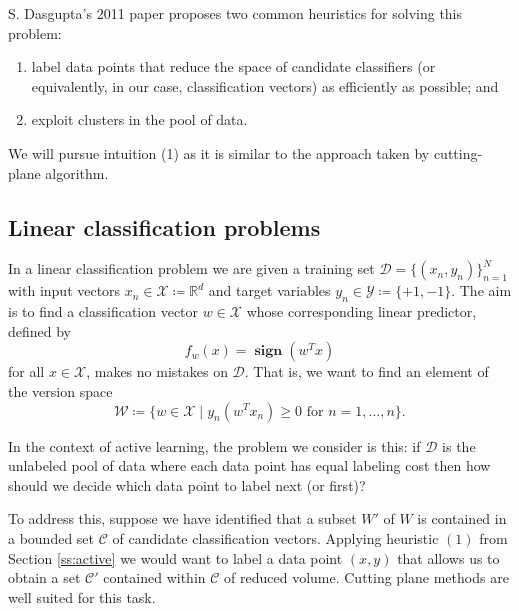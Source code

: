 \documentclass[11pt]{amsart}
\theoremstyle{definition}
\theoremstyle{remark}
\newcommand{\transpose}{T}
\DeclareMathOperator{\sign}{\textbf{sign}}
\begin{document}
        S. Dasgupta's 2011 paper \cite{Das11} proposes two common heuristics for solving this problem:
        \begin{enumerate}
            \item label data points that reduce the space of candidate classifiers (or equivalently, in our case, classification vectors) as efficiently as possible; and
            \item exploit clusters in the pool of data.
        \end{enumerate}   
        We will pursue intuition (1) as it is similar to the approach taken by cutting-plane algorithm. 

    \subsection{Linear classification problems}\label{ss:classification}
        In a linear classification problem we are given a training set $\mathcal{D} = \{(x_n, y_n)\}_{n=1}^N$ with input vectors $x_n \in \mathcal{X} \coloneqq \mathbb{R}^d$ and target variables $y_n \in \mathcal{Y} \coloneqq \{+1, -1\}$. The aim is to find a classification vector $w \in \mathcal{X}$ whose corresponding linear predictor, defined by
        \begin{equation*}
            f_w(x) = \sign(w^\transpose x) 
        \end{equation*}
        for all $x \in \mathcal{X}$, makes no mistakes on $\mathcal{D}$. That is, we want to find an element of the version space
        \begin{equation*}
            \mathcal{W} \coloneqq \{ w \in \mathcal{X} \;|\; y_n (w^\transpose x_n) \geq 0 \text{ for $n = 1, \dots, n$}\}.
        \end{equation*}

        In the context of active learning, the problem we consider is this: if $\mathcal{D}$ is the unlabeled pool of data where each data point has equal labeling cost then how should we decide which data point to label next (or first)? 

        To address this, suppose we have identified that a subset $W'$ of $W$ is contained in a bounded set $\mathcal{C}$ of candidate classification vectors. Applying heuristic $(1)$ from Section \ref{ss:active} we would want to label a data point $(x, y)$ that allows us to obtain a set $\mathcal{C}'$ contained within $\mathcal{C}$ of reduced volume. Cutting plane methods are well suited for this task.
    
\end{document}

